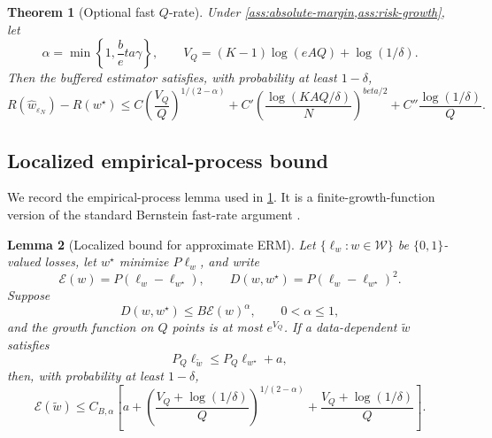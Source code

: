 \documentclass[11pt]{article}
\def\beta{beta}%
\newtheorem{theorem}{Theorem}[section]
\newtheorem{lemma}[theorem]{Lemma}
\newcommand{\calW}{\mathcal W}
\newcommand{\eps}{\varepsilon}
\begin{document}
\begin{theorem}[Optional fast $Q$-rate]
\label{thm:fastQ}
Under \cref{ass:absolute-margin,ass:risk-growth}, let
\[
\alpha=\min\left\{1,\frac\beta\gamma\right\},
\qquad
V_Q=(K-1)\log(eAQ)+\log(1/\delta).
\]
Then the buffered estimator satisfies, with probability at least $1-\delta$,
\begin{equation}
\label{eq:fastQ}
R(\widehat w_{\eps_N})-R(w^\star)
\le
C\left(\frac{V_Q}{Q}\right)^{1/(2-\alpha)}
+C'\left(\frac{\log(KAQ/\delta)}{N}\right)^{\beta/2}
+C''\frac{\log(1/\delta)}{Q}.
\end{equation}
\end{theorem}

\subsection{Localized empirical-process bound}

We record the empirical-process lemma used in \cref{thm:fastQ}.  It is a finite-growth-function version of the standard Bernstein fast-rate argument \citep{MassartNedelec}.

\begin{lemma}[Localized bound for approximate ERM]
\label{lem:localized}
Let $\{\ell_w:w\in\calW\}$ be $\{0,1\}$-valued losses, let $w^\star$ minimize $P\ell_w$, and write
\[
\mathcal E(w)=P(\ell_w-\ell_{w^\star}),
\qquad
D(w,w^\star)=P(\ell_w-\ell_{w^\star})^2.
\]
Suppose
\[
D(w,w^\star)\le B\mathcal E(w)^\alpha,
\qquad 0<\alpha\le1,
\]
and the growth function on $Q$ points is at most $e^{V_Q}$.  If a data-dependent $\widetilde w$ satisfies
\[
P_Q\ell_{\widetilde w}
\le
P_Q\ell_{w^\star}+a,
\]
then, with probability at least $1-\delta$,
\begin{equation}
\label{eq:localized-bound}
\mathcal E(\widetilde w)
\le
C_{B,\alpha}
\left[
 a
+
\left(\frac{V_Q+\log(1/\delta)}{Q}\right)^{1/(2-\alpha)}
+
\frac{V_Q+\log(1/\delta)}{Q}
\right].
\end{equation}
\end{lemma}
\end{document}
